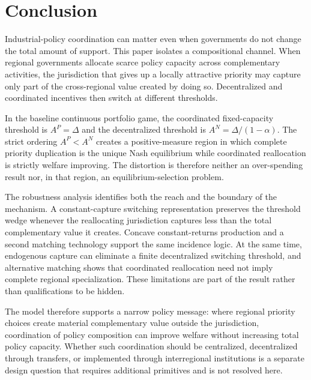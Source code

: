\section{Conclusion}
\label{sec:conclusion}

Industrial-policy coordination can matter even when governments do not change the total amount of support. This paper isolates a compositional channel. When regional governments allocate scarce policy capacity across complementary activities, the jurisdiction that gives up a locally attractive priority may capture only part of the cross-regional value created by doing so. Decentralized and coordinated incentives then switch at different thresholds.

In the baseline continuous portfolio game, the coordinated fixed-capacity threshold is $A^P=\Delta$ and the decentralized threshold is $A^N=\Delta/(1-\alpha)$. The strict ordering $A^P<A^N$ creates a positive-measure region in which complete priority duplication is the unique Nash equilibrium while coordinated reallocation is strictly welfare improving. The distortion is therefore neither an over-spending result nor, in that region, an equilibrium-selection problem.

The robustness analysis identifies both the reach and the boundary of the mechanism. A constant-capture switching representation preserves the threshold wedge whenever the reallocating jurisdiction captures less than the total complementary value it creates. Concave constant-returns production and a second matching technology support the same incidence logic. At the same time, endogenous capture can eliminate a finite decentralized switching threshold, and alternative matching shows that coordinated reallocation need not imply complete regional specialization. These limitations are part of the result rather than qualifications to be hidden.

The model therefore supports a narrow policy message: where regional priority choices create material complementary value outside the jurisdiction, coordination of policy composition can improve welfare without increasing total policy capacity. Whether such coordination should be centralized, decentralized through transfers, or implemented through interregional institutions is a separate design question that requires additional primitives and is not resolved here.
